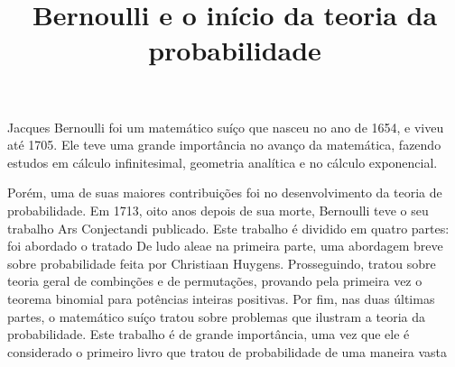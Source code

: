 \documentclass{article}
\title{Bernoulli e o início da teoria da probabilidade}
\begin{document}
\maketitle
	Jacques Bernoulli foi um matemático suíço que nasceu no ano de 1654, e viveu até 1705. Ele teve uma grande importância no avanço da matemática, fazendo estudos em cálculo infinitesimal, geometria analítica e no cálculo exponencial.
		
	Porém, uma de suas maiores contribuições foi no desenvolvimento da teoria de probabilidade. Em 1713, oito anos depois de sua morte, Bernoulli teve o seu trabalho Ars Conjectandi publicado. Este trabalho é dividido em quatro partes: foi abordado o tratado De ludo aleae na primeira parte, uma abordagem breve sobre probabilidade feita por Christiaan Huygens. Prosseguindo, tratou sobre teoria geral de combinções e de permutações, provando pela primeira vez o teorema binomial para potências inteiras positivas. Por fim, nas duas últimas partes, o matemático suíço tratou sobre problemas que ilustram a teoria da probabilidade. Este trabalho é de grande importância, uma vez que ele é considerado o primeiro livro que tratou de probabilidade de uma maneira vasta
\end{document}
